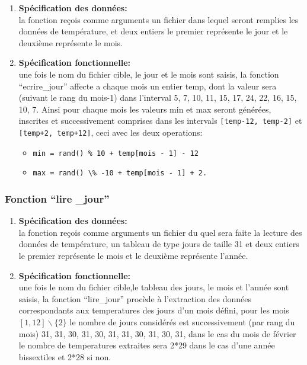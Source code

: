 \begin{enumerate}[label=\textbf{\Alph* --}]
	\item \textbf{Spécification des données: \\}
	la fonction reçois comme arguments un fichier dans lequel seront remplies les données de température, et deux entiers le premier représente le jour et le deuxième représente le mois. 
		
    \item \textbf{Spécification fonctionnelle: \\}
    une fois le nom du fichier cible, le jour et le mois sont saisis, la fonction ``ecrire\_jour'' affecte a chaque mois un entier temp, dont la valeur sera (suivant le rang du mois-1) dans l’interval {5, 7, 10, 11, 15, 17, 24, 22, 16, 15, 10, 7}. Ainsi pour chaque mois les valeurs min
et max seront générées, inscrites et successivement comprises dans les intervals \lstinline$[temp-12, temp-2]$
 et \lstinline$[temp+2, temp+12]$,
ceci avec les deux operations: 

\begin{itemize}
\item \lstinline$min = rand() % 10 + temp[mois - 1] - 12$
\item \lstinline$max = rand() \% -10 + temp[mois - 1] + 2.$
\end{itemize}
\end{enumerate}

\subsubsection{Fonction ``lire	\_jour''}

\begin{enumerate}[label=\textbf{\Alph* --}]
	\item \textbf{Spécification des données: \\}
	la fonction reçois comme arguments un fichier du quel sera faite la lecture des données de température, un tableau de type jours de taille 31 et deux entiers le premier représente le mois et le deuxième représente l’année. 
		
    \item \textbf{Spécification fonctionnelle: \\}
    une fois le nom du fichier cible,le tableau des jours, le mois et l’année sont saisis, la fonction ``lire\_jour''
     procède à l’extraction des données correspondants aux temperatures des jours d’un mois défini, pour les mois 
   $[1, 12]\backslash\{2\}$ le nombre de jours considérés est successivement (par rang du mois) 
   {31, 31, 30, 31, 30, 31, 31, 30, 31, 30, 31}, dans le cas du mois
  de février le nombre de temperatures extraites sera 2*29 dans le cas d’une année bissextiles et 2*28 si non.

\end{enumerate}

